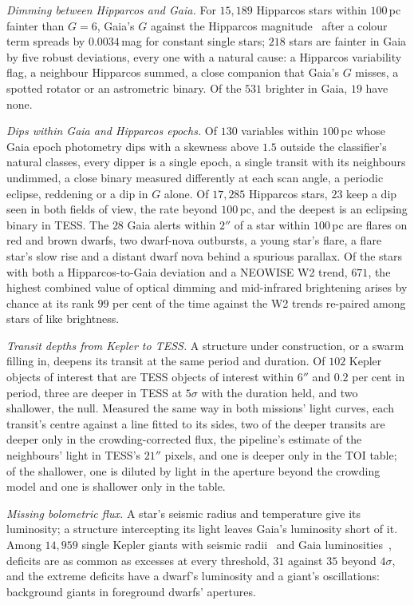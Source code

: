 \documentclass[3p,11pt]{elsarticle}
\begin{document}
\emph{Dimming between Hipparcos and Gaia.} For $15{,}189$ Hipparcos stars within
$100$\,pc fainter than $G=6$, Gaia's $G$ against the Hipparcos magnitude~\cite{Perryman1997}
after a colour term spreads by $0.0034$\,mag for constant single stars; $218$ stars are
fainter in Gaia by five robust deviations, every one with a natural cause: a Hipparcos
variability flag, a neighbour Hipparcos summed, a close companion that Gaia's $G$ misses,
a spotted rotator or an astrometric binary. Of the $531$ brighter in Gaia, $19$ have
none.

\emph{Dips within Gaia and Hipparcos epochs.} Of $130$ variables within $100$\,pc whose
Gaia epoch photometry dips with a skewness above $1.5$ outside the classifier's natural
classes, every dipper is a single epoch, a single transit with its neighbours undimmed,
a close binary measured differently at each scan angle, a periodic eclipse, reddening or
a dip in $G$ alone. Of $17{,}285$ Hipparcos stars, $23$ keep a dip seen in both fields of
view, the rate beyond $100$\,pc, and the deepest is an eclipsing binary in TESS. The
$28$ Gaia alerts within $2''$ of a star within $100$\,pc are flares on red and brown
dwarfs, two dwarf-nova outbursts, a young star's flare, a flare star's slow rise and a
distant dwarf nova behind a spurious parallax. Of the stars with both a Hipparcos-to-Gaia
deviation and a NEOWISE W2 trend, $671$, the highest combined value of optical dimming
and mid-infrared brightening arises by chance at its rank $99$ per cent of the time
against the W2 trends re-paired among stars of like brightness.

\emph{Transit depths from Kepler to TESS.} A structure under construction, or a swarm
filling in, deepens its transit at the same period and duration. Of $102$ Kepler objects
of interest that are TESS objects of interest within $6''$ and $0.2$ per cent in period,
three are deeper in TESS at $5\sigma$ with the duration held, and two shallower, the
null. Measured the same way in both missions' light curves, each transit's centre against
a line fitted to its sides, two of the deeper transits are deeper only in the
crowding-corrected flux, the pipeline's estimate of the neighbours' light in TESS's
$21''$ pixels, and one is deeper only in the TOI table; of the shallower, one is diluted
by light in the aperture beyond the crowding model and one is shallower only in the
table.

\emph{Missing bolometric flux.} A star's seismic radius and temperature give its
luminosity; a structure intercepting its light leaves Gaia's luminosity short of it.
Among $14{,}959$ single Kepler giants with seismic radii~\cite{Yu2018} and Gaia
luminosities~\cite{Berger2020}, deficits are as common as excesses at every threshold,
$31$ against $35$ beyond $4\sigma$, and the extreme deficits have a dwarf's luminosity
and a giant's oscillations: background giants in foreground dwarfs' apertures.
\end{document}
